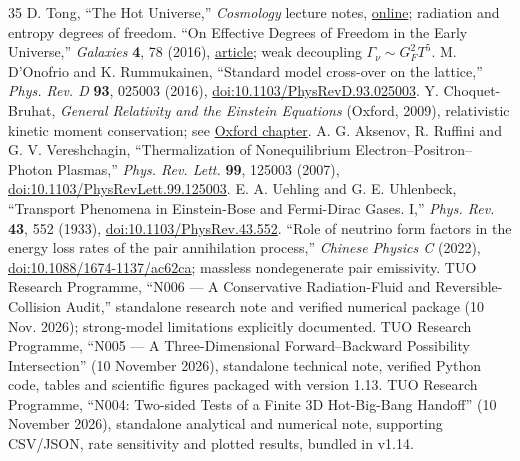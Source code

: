 \documentclass[11pt,a4paper]{article}
\theoremstyle{tmon}
\theoremstyle{definition}
\begin{document}
\begin{thebibliography}{35}
 D. Tong, ``The Hot Universe,'' \emph{Cosmology} lecture notes, \href{https://www.damtp.cam.ac.uk/user/tong/cosmo/cosmohtml/S2.html}{online}; radiation and entropy degrees of freedom.
 ``On Effective Degrees of Freedom in the Early Universe,'' \emph{Galaxies} \textbf{4}, 78 (2016), \href{https://www.mdpi.com/2075-4434/4/4/78}{article}; weak decoupling $\Gamma_\nu\sim G_F^2T^5$.
 M. D'Onofrio and K. Rummukainen, ``Standard model cross-over on the lattice,'' \emph{Phys. Rev. D} \textbf{93}, 025003 (2016), \href{https://doi.org/10.1103/PhysRevD.93.025003}{doi:10.1103/PhysRevD.93.025003}.
 Y. Choquet-Bruhat, \emph{General Relativity and the Einstein Equations} (Oxford, 2009), relativistic kinetic moment conservation; see \href{https://academic.oup.com/book/56195/chapter/443489689}{Oxford chapter}. 
 A. G. Aksenov, R. Ruffini and G. V. Vereshchagin, ``Thermalization of Nonequilibrium Electron--Positron--Photon Plasmas,'' \emph{Phys. Rev. Lett.} \textbf{99}, 125003 (2007), \href{https://doi.org/10.1103/PhysRevLett.99.125003}{doi:10.1103/PhysRevLett.99.125003}.
 E. A. Uehling and G. E. Uhlenbeck, ``Transport Phenomena in Einstein-Bose and Fermi-Dirac Gases. I,'' \emph{Phys. Rev.} \textbf{43}, 552 (1933), \href{https://doi.org/10.1103/PhysRev.43.552}{doi:10.1103/PhysRev.43.552}.
 ``Role of neutrino form factors in the energy loss rates of the pair annihilation process,'' \emph{Chinese Physics C} (2022), \href{https://doi.org/10.1088/1674-1137/ac62ca}{doi:10.1088/1674-1137/ac62ca}; massless nondegenerate pair emissivity.
 TUO Research Programme, ``N006 --- A Conservative Radiation-Fluid and Reversible-Collision Audit,'' standalone research note and verified numerical package (10 Nov. 2026); strong-model limitations explicitly documented.
 TUO Research Programme, ``N005 --- A Three-Dimensional Forward--Backward Possibility Intersection'' (10 November 2026), standalone technical note, verified Python code, tables and scientific figures packaged with version 1.13.
 TUO Research Programme, ``N004: Two-sided Tests of a Finite 3D Hot-Big-Bang Handoff'' (10 November 2026), standalone analytical and numerical note, supporting CSV/JSON, rate sensitivity and plotted results, bundled in v1.14.

\end{thebibliography}
\end{document}
